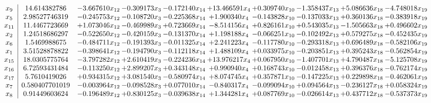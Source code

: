 \documentclass[10pt]{article}
\begin{document}
 \[\begin{array}{c| c c@{\hskip 2pt} c@{\hskip 2pt} c@{\hskip 2pt} c@{\hskip 2pt} c@{\hskip 2pt} c@{\hskip 2pt} c@{\hskip 2pt} c@{\hskip 2pt} }
 x_{9}   &  14.614382786 & -3.667610 x_{12} & -0.309173 x_{3} & -0.172140 x_{14} & + 13.466591 x_{4} & + 0.309740 x_{10} & -1.358437 x_{13} & + 5.086636 x_{18} & -4.748018 x_{19}\\
 x_{5}   &  2.98527746319 & -0.245753 x_{12} & -0.108720 x_{3} & -0.225368 x_{14} & + 1.900340 x_{4} & -0.143828 x_{10} & -0.137033 x_{13} & + 0.360136 x_{18} & -0.383918 x_{19}\\
 x_{11}   &  11.4467723669 & + 1.073046 x_{12} & -0.469989 x_{3} & + 0.723669 x_{14} & -8.514156 x_{4} & + 0.826161 x_{10} & + 0.543035 x_{13} & -1.505663 x_{18} & + 0.496602 x_{19}\\
 x_{2}   &  1.24518686297 & -0.522650 x_{12} & -0.420159 x_{3} & -0.131370 x_{14} & + 1.198188 x_{4} & -0.066251 x_{10} & -0.102492 x_{13} & + 0.579275 x_{18} & -0.452435 x_{19}\\
 x_{6}   &  1.5469988675 & -0.484711 x_{12} & -0.191393 x_{3} & -0.011325 x_{14} & + 2.241223 x_{4} & -0.117780 x_{10} & -0.293318 x_{13} & + 0.696489 x_{18} & -0.582106 x_{19}\\
 x_{1}   &  3.51528878822 & -0.398641 x_{12} & -0.194790 x_{3} & -0.112118 x_{14} & + 1.488109 x_{4} & + 0.033975 x_{10} & -0.203851 x_{13} & + 0.395243 x_{18} & -0.562854 x_{19}\\
 x_{15}   &  18.0305775764 & -3.797282 x_{12} & + 2.610419 x_{3} & -0.224236 x_{14} & + 13.976217 x_{4} & + 0.067950 x_{10} & -1.407701 x_{13} & + 4.790487 x_{18} & -5.125708 x_{19}\\
 x_{16}   &  6.72593431484 & -0.113250 x_{12} & + 2.899207 x_{3} & + 0.343148 x_{14} & + 0.990940 x_{4} & + 0.168743 x_{10} & -0.012458 x_{13} & + 0.396376 x_{18} & -0.762174 x_{19}\\
 x_{17}   &  5.7610419026 & + 0.934315 x_{12} & + 3.081540 x_{3} & -0.580974 x_{14} & + 8.074745 x_{4} & + 0.357871 x_{10} & -0.147225 x_{13} & + 0.229898 x_{18} & -0.462061 x_{19}\\
 x_{7}   &  0.580407701019 & -0.003964 x_{12} & -0.098528 x_{3} & + 0.077010 x_{14} & -0.840317 x_{4} & -0.099094 x_{10} & + 0.094564 x_{13} & -0.236127 x_{18} & + 0.058324 x_{19}\\
 x_{8}   &  0.91449603624 & -0.196489 x_{12} & + 0.830125 x_{3} & -0.039638 x_{14} & + 1.344281 x_{4} & + 0.087769 x_{10} & -0.026614 x_{13} & + 0.437712 x_{18} & -0.537373 x_{19}\\

\end{array}\]
\end{document}

